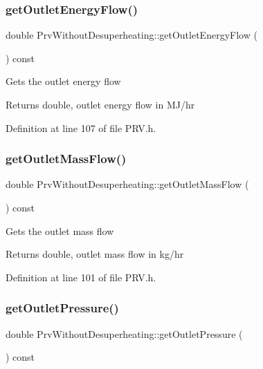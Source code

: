\subsubsection{\texorpdfstring{get\+Outlet\+Energy\+Flow()}{getOutletEnergyFlow()}}
{\footnotesize\ttfamily double Prv\+Without\+Desuperheating\+::get\+Outlet\+Energy\+Flow (\begin{DoxyParamCaption}{ }\end{DoxyParamCaption}) const\hspace{0.3cm}{\ttfamily [inline]}}

Gets the outlet energy flow \begin{DoxyReturn}{Returns}
double, outlet energy flow in M\+J/hr 
\end{DoxyReturn}


Definition at line 107 of file P\+R\+V.\+h.

\mbox{\label{class_prv_without_desuperheating_a12c0bf1f0c29e56e6e07ece3fe865c1b}} 
\subsubsection{\texorpdfstring{get\+Outlet\+Mass\+Flow()}{getOutletMassFlow()}}
{\footnotesize\ttfamily double Prv\+Without\+Desuperheating\+::get\+Outlet\+Mass\+Flow (\begin{DoxyParamCaption}{ }\end{DoxyParamCaption}) const\hspace{0.3cm}{\ttfamily [inline]}}

Gets the outlet mass flow \begin{DoxyReturn}{Returns}
double, outlet mass flow in kg/hr 
\end{DoxyReturn}


Definition at line 101 of file P\+R\+V.\+h.

\mbox{\label{class_prv_without_desuperheating_ae1d335703442deec2f2c2f93e4c862f2}} 
\subsubsection{\texorpdfstring{get\+Outlet\+Pressure()}{getOutletPressure()}}
{\footnotesize\ttfamily double Prv\+Without\+Desuperheating\+::get\+Outlet\+Pressure (\begin{DoxyParamCaption}{ }\end{DoxyParamCaption}) const\hspace{0.3cm}{\ttfamily [inline]}}

